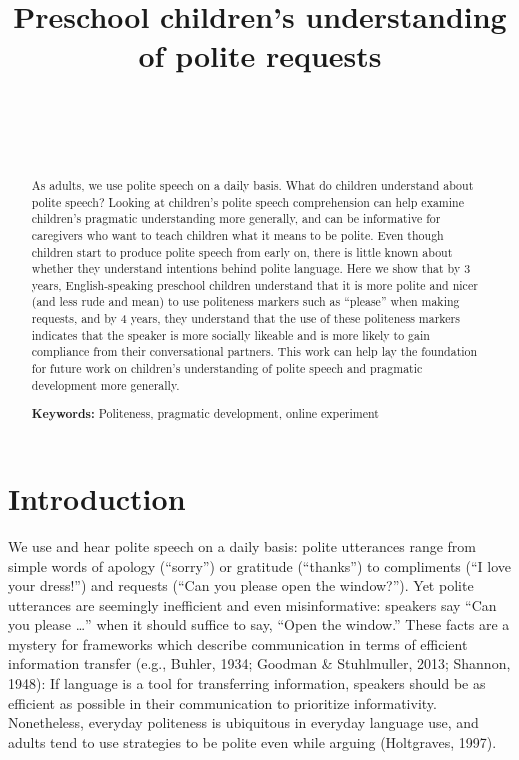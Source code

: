 \documentclass[10pt, letterpaper]{article}
\title{Preschool children's understanding of polite requests}
\author{{\large \bf } \\ \texttt{} \\  \\}
\begin{document}
\maketitle

\begin{abstract}
As adults, we use polite speech on a daily basis. What do children
understand about polite speech? Looking at children's polite speech
comprehension can help examine children's pragmatic understanding more
generally, and can be informative for caregivers who want to teach
children what it means to be polite. Even though children start to
produce polite speech from early on, there is little known about whether
they understand intentions behind polite language. Here we show that by
3 years, English-speaking preschool children understand that it is more
polite and nicer (and less rude and mean) to use politeness markers such
as ``please'' when making requests, and by 4 years, they understand that
the use of these politeness markers indicates that the speaker is more
socially likeable and is more likely to gain compliance from their
conversational partners. This work can help lay the foundation for
future work on children's understanding of polite speech and pragmatic
development more generally.

\textbf{Keywords:}
Politeness, pragmatic development, online experiment
\end{abstract}

\section{Introduction}\label{introduction}

We use and hear polite speech on a daily basis: polite utterances range
from simple words of apology (``sorry'') or gratitude (``thanks'') to
compliments (``I love your dress!'') and requests (``Can you please open
the window?''). Yet polite utterances are seemingly inefficient and even
misinformative: speakers say ``Can you please \ldots{}'' when it should
suffice to say, ``Open the window.'' These facts are a mystery for
frameworks which describe communication in terms of efficient
information transfer (e.g., Buhler, 1934; Goodman \& Stuhlmuller, 2013;
Shannon, 1948): If language is a tool for transferring information,
speakers should be as efficient as possible in their communication to
prioritize informativity. Nonetheless, everyday politeness is ubiquitous
in everyday language use, and adults tend to use strategies to be polite
even while arguing (Holtgraves, 1997).
\end{document}

